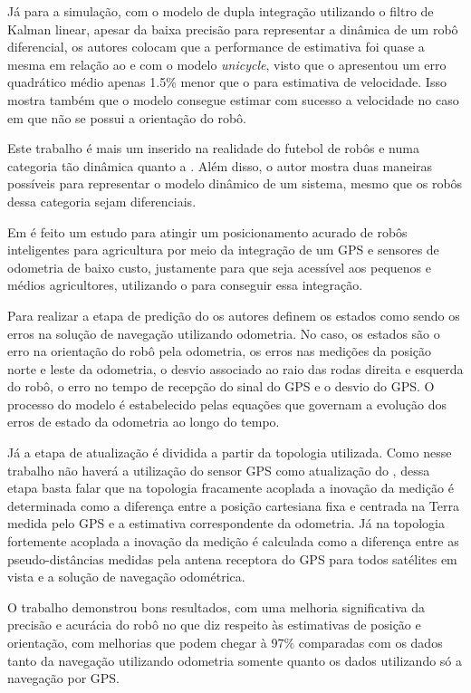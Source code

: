 \documentclass[acronym, symbols, table, deposito]{fei}
\begin{document}
Já para a simulação, com o modelo de dupla integração utilizando o filtro de Kalman linear, apesar da baixa precisão para representar a dinâmica de um robô diferencial, os autores colocam que a performance de estimativa foi quase a mesma em relação ao  e  com o modelo \textit{unicycle}, visto que o  apresentou um erro quadrático médio apenas 1.5\% menor que o  para estimativa de velocidade. Isso mostra também que o modelo consegue estimar com sucesso a velocidade no caso em que não se possui a orientação do robô.

Este trabalho é mais um inserido na realidade do futebol de robôs e numa categoria tão dinâmica quanto a . Além disso, o autor mostra duas maneiras possíveis para representar o modelo dinâmico de um sistema, mesmo que os robôs dessa categoria sejam diferenciais.

Em \textcite{10333060} é feito um estudo para atingir um posicionamento acurado de robôs inteligentes para agricultura por meio da integração de um GPS e sensores de odometria de baixo custo, justamente para que seja acessível aos pequenos e médios agricultores, utilizando o  para conseguir essa integração.

Para realizar a etapa de predição do  os autores definem os estados como sendo os erros na solução de navegação utilizando odometria. No caso, os estados são o erro na orientação do robô pela odometria, os erros nas medições da posição norte e leste da odometria, o desvio associado ao raio das rodas direita e esquerda do robô, o erro no tempo de recepção do sinal do GPS e o desvio do GPS. O processo do modelo é estabelecido pelas equações que governam a evolução dos erros de estado da odometria ao longo do tempo.

Já a etapa de atualização é dividida a partir da topologia utilizada. Como nesse trabalho não haverá a utilização do sensor GPS como atualização do , dessa etapa basta falar que na topologia fracamente acoplada a inovação da medição é determinada como a diferença entre a posição cartesiana fixa e centrada na Terra medida pelo GPS e a estimativa correspondente da odometria. Já na topologia fortemente acoplada a inovação da medição é calculada como a diferença entre as pseudo-distâncias medidas pela antena receptora do GPS para todos satélites em vista e a solução de navegação odométrica.

O trabalho demonstrou bons resultados, com uma melhoria significativa da precisão e acurácia do robô no que diz respeito às estimativas de posição e orientação, com melhorias que podem chegar à 97\% comparadas com os dados tanto da navegação utilizando odometria somente quanto os dados utilizando só a navegação por GPS.
\end{document}
